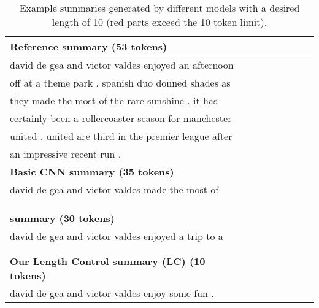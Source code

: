 \begin{table}[th!]
\begin{center}
\caption{\label{tab:existing-example} Example summaries generated by
different models with a desired length of 10 (red parts exceed the 10 token
limit).}
\small
\begin{tabular}{lclclclc}%
\hline \bf Reference summary (53 tokens) \\
\hline david de gea and victor valdes enjoyed an afternoon \\
       off at a theme park . spanish duo donned shades as \\
	   they made the most of the rare sunshine . it has \\
	   certainly been a rollercoaster season for manchester \\
	   united . united are third in the premier league after \\
	   an impressive recent run .\\
\hline \bf Basic CNN summary (35 tokens)\\
\hline david de gea and victor valdes made the most of \\
       \color{red}{the rare english sun with a trip to a theme park .}\\
	   \color{red}{david de gea and victor valdes enjoyed some fun in}\\
	   \color{red}{the sun .}\\
\hline \bf \cite{abs-1711-05217} summary (30 tokens) \\
\hline david de gea and victor valdes enjoyed a trip to a \\
       \color{red}{theme park . the pair enjoyed a relaxing time just}\\
	   \color{red}{days after united 's win against manchester city .}\\
\hline \bf  Our Length Control summary (LC) (10 tokens)\\
\hline david de gea and victor valdes enjoy some fun .\\
\hline
\end{tabular}
\end{center}
\end{table}

